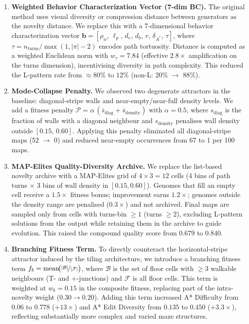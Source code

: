 \begin{enumerate}

  \item \textbf{Weighted Behavior Characterization Vector (7-dim BC).}
  The original method uses visual diversity or compression distance between generators
  as the novelty distance.
  We replace this with a 7-dimensional behavior characterization vector
  $\mathbf{b} = [\rho_w,\, \ell_p,\, d_e,\, d_b,\, r,\, \delta_{A^*},\, \tau]$,
  where $\tau = n_\text{turns} / \max(1, |\pi|-2)$ encodes path tortuosity.
  Distance is computed as a weighted Euclidean norm with $w_\tau = 7.84$
  (effective $2.8\times$ amplification on the turns dimension),
  incentivising diversity in path complexity.
  This reduced the L-pattern rate from $\approx\!80\%$ to $12\%$ (non-L: 20\% $\to$ 88\%).

  \item \textbf{Mode-Collapse Penalty.}
  We observed two degenerate attractors in the baseline: diagonal-stripe walls
  and near-empty/near-full density levels.
  We add a fitness penalty
  $\mathcal{P} = \alpha\,(\bar{s}_\text{diag} + \bar{s}_\text{density})$
  with $\alpha = 0.5$, where $s_\text{diag}$ is the fraction of walls with a diagonal
  neighbour and $s_\text{density}$ penalises wall density outside $[0.15,\,0.60]$.
  Applying this penalty eliminated all diagonal-stripe maps (52 $\to$ 0)
  and reduced near-empty occurrences from 67 to 1 per 100 maps.

  \item \textbf{MAP-Elites Quality-Diversity Archive.}
  We replace the list-based novelty archive with a MAP-Elites grid
  \citep{mouret2015illuminating} of $4 \times 3 = 12$ cells
  (4 bins of path turns $\times$ 3 bins of wall density in $[0.15, 0.60]$).
  Genomes that fill an empty cell receive a $1.5\times$ fitness bonus;
  improvement earns $1.2\times$; genomes outside the density range are penalised ($0.3\times$)
  and not archived.
  Final maps are sampled only from cells with turns-bin $\geq 1$ (turns $\geq 2$),
  excluding L-pattern solutions from the output while retaining them in the archive
  to guide evolution.
  This raised the compound quality score from $0.679$ to $0.840$.

  \item \textbf{Branching Fitness Term.}
  To directly counteract the horizontal-stripe attractor induced by the tiling
  architecture, we introduce a branching fitness term
  $f_b = \operatorname{mean}\!\bigl(\nicefrac{|\mathcal{B}|}{|\mathcal{F}|}\bigr)$,
  where $\mathcal{B}$ is the set of floor cells with $\geq\!3$ walkable neighbours
  (T- and +-junctions) and $\mathcal{F}$ is all floor cells.
  This term is weighted at $w_b = 0.15$ in the composite fitness, replacing
  part of the intra-novelty weight ($0.30 \to 0.20$).
  Adding this term increased A* Difficulty from $0.06$ to $\mathbf{0.778}$ ($+13\times$)
  and A* Edit Diversity from $0.135$ to $\mathbf{0.450}$ ($+3.3\times$),
  reflecting substantially more complex and varied maze structures.

\end{enumerate}
